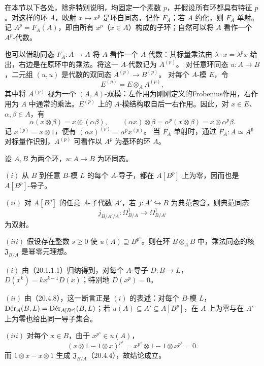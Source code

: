 在本节以下各处，除非特别说明，均固定一个素数 $p$，并假设所有环都具有特征 $p$。对这样的环 $A$，映射 $x\mapsto x^p$ 是环自同态，记作 $F_A$；若 $A$ 约化，则 $F_A$ 单射。记 $A^p=F_A(A)$，即由所有 $x^p$（$x\in A$）构成的子环；自然可以将 $A$ 看作一个 $A^p$-代数。

也可以借助同态 $F_A:A\to A$ 将 $A$ 看作一个 $A$-代数：其标量乘法由
$\lambda\cdot x=\lambda^p x$ 给出，右边是在原环中的乘法。将这一 $A$-代数记为 $A^{(p)}$。
对任意环同态 $u:A\to B$，二元组 $(u,u)$ 是代数的双同态 $A^{(p)}\to B^{(p)}$。
对每个 $A$-模 $E$，令
\[
 E^{(p)}=E\otimes_A A^{(p)},
\]
其中将 $A^{(p)}$ 视为一个 $(A,A)$-双模：左作用为刚刚定义的Frobenius作用，右作用为 $A$ 中通常的乘法。$E^{(p)}$ 上的 $A$-模结构取自后一右作用。因此，对 $x\in E$、$\alpha,\beta\in A$，有
\[
 \alpha(x\otimes\beta)=x\otimes(\alpha\beta),\qquad
 (\alpha x)\otimes\beta=\alpha^p(x\otimes\beta)=x\otimes\alpha^p\beta.
\]
记 $x^{(p)}=x\otimes1$，便有 $(\alpha x)^{(p)}=\alpha^p x^{(p)}$。
当 $F_A$ 单射时，通过 $F_A:A\simeq A^p$ 对标量作识别，$A^{(p)}$ 可看作以 $A^p$ 为基环的环 $A$。

设 $A,B$ 为两个环，$u:A\to B$ 为环同态。

$(i)$ 从 $B$ 到任意 $B$-模 $L$ 的每个 $A$-导子，都在 $A[B^p]$ 上为零，因而也是 $A[B^p]$-导子。

$(ii)$ 对 $A[B^p]$ 的任意 $A$-子代数 $A'$，若 $j:A'\hookrightarrow B$ 为典范包含，则典范同态
\[
 j_{B/A'/A}:\Omega^1_{B/A}\longrightarrow\Omega^1_{B/A'}
\]
为双射。

$(iii)$ 假设存在整数 $s\ge0$ 使 $u(A)\supseteq B^{p^s}$。则在环 $B\otimes_A B$ 中，乘法同态的核 $\mathfrak J_{B/A}$ 是幂零元理想。

\eproof
$(i)$ 由（20.1.1.1）归纳得到，对每个 $A$-导子 $D:B\to L$，
$D(x^k)=kx^{k-1}D(x)$；特别地 $D(x^p)=0$。

$(ii)$ 由（20.4.8），这一断言正是 $(i)$ 的表述：对每个 $B$-模 $L$，
$\Der_A(B,L)=\Der_{A[B^p]}(B,L)$；若 $u(A)\subseteq A'\subseteq A[B^p]$，在 $A$ 上为零与在 $A'$ 上为零也给出同一导子集合。

$(iii)$ 对每个 $x\in B$，由于 $x^{p^s}\in u(A)$，
\[
 (x\otimes1-1\otimes x)^{p^s}
 =x^{p^s}\otimes1-1\otimes x^{p^s}=0.
\]
而 $1\otimes x-x\otimes1$ 生成 $\mathfrak J_{B/A}$（20.4.4），故结论成立。
\finishproof

